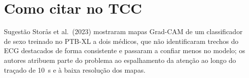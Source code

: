 \documentclass[11pt,a4paper]{article}
\begin{document}
\section{Como citar no TCC}
\begin{infobox}[ok]{Sugestão}
Storås et al.\ (2023) mostraram mapas Grad-CAM de um classificador de sexo treinado no PTB-XL a dois médicos, que não identificaram trechos do ECG destacados de forma consistente e passaram a confiar menos no modelo; os autores atribuem parte do problema ao espalhamento da atenção ao longo do traçado de 10~s e à baixa resolução dos mapas.
\end{infobox}
\end{document}

